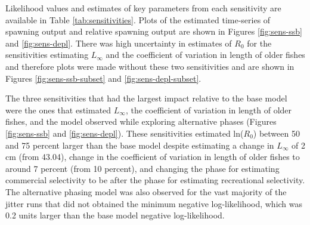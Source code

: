 \documentclass[11pt,
  english,
  letterpaper,
]{article}
\begin{document}
\leavevmode\tagmcend\tagstructend\par


Likelihood values and estimates of key parameters from each sensitivity are available in Table \ref{tab:sensitivities}. Plots of the estimated time-series of spawning output and relative spawning output are shown in Figures \ref{fig:sens-ssb} and \ref{fig:sens-depl}. There was high uncertainty in estimates of {\(R_0\)\leavevmode\tagmcend\tagstructend} for the sensitivities estimating {\(L_{\infty}\)\leavevmode\tagmcend\tagstructend} and the coefficient of variation in length of older fishes and therefore plots were made without these two sensitivities and are shown in Figures \ref{fig:sens-ssb-subset} and \ref{fig:sens-depl-subset}.

\leavevmode\tagmcend\tagstructend\par


The three sensitivities that had the largest impact relative to the base model were the ones that estimated {\(L_{\infty}\)\leavevmode\tagmcend\tagstructend}, the coefficient of variation in length of older fishes, and the model observed while exploring alternative phases (Figures \ref{fig:sens-ssb} and \ref{fig:sens-depl}). These sensitivities estimated ln({\(R_0\)\leavevmode\tagmcend\tagstructend}) between 50 and 75 percent larger than the base model despite estimating a change in {\(L_{\infty}\)\leavevmode\tagmcend\tagstructend} of 2 cm (from 43.04), change in the coefficient of variation in length of older fishes to around 7 percent (from 10 percent), and changing the phase for estimating commercial selectivity to be after the phase for estimating recreational selectivity. The alternative phasing model was also observed for the vast majority of the jitter runs that did not obtained the minimum negative log-likelihood, which was 0.2 units larger than the base model negative log-likelihood.

\leavevmode\tagmcend\tagstructend\par

\end{document}
